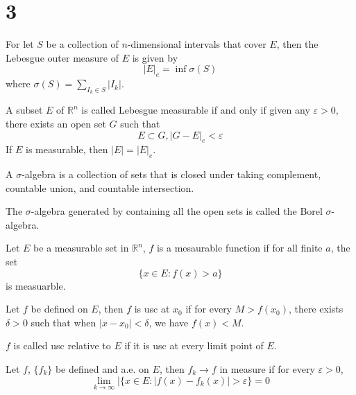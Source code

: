 \documentclass[openany]{book}
\newcommand{\R}{\mathbb{R}}
\begin{document}
\chapter{3}
\begin{defn}
    For let $S$ be a collection of $n$-dimensional intervals that cover $E$, then the Lebesgue outer measure of $E$ is given by
    \begin{equation*}
        |E|_e=\inf\sigma(S)
    \end{equation*}
    where $\sigma(S)=\sum_{I_k\in S}|I_k|$.
\end{defn}
\begin{defn}
    A subset $E$ of $\R^n$ is called Lebesgue measurable if and only if given any $\varepsilon>0$, there exists an open set $G$ such that 
    \begin{equation*}
        E\subset G, |G-E|_e<\varepsilon
    \end{equation*}
    If $E$ is measurable, then $|E|=|E|_e$.
\end{defn}
\begin{defn}
    A $\sigma$-algebra is a collection of sets that is closed under taking complement, countable union, and countable intersection.

    The $\sigma$-algebra generated by containing all the open sets is called the Borel $\sigma$-algebra.
\end{defn}
\begin{defn}
    Let $E$ be a measurable set in $\R^n$, $f$ is a mesaurable function if for all finite $a$, the set 
    \begin{equation*}
        \{x\in E: f(x)>a\}
    \end{equation*}
    is measuarble. 
\end{defn}
\begin{defn}
    Let $f$ be defined on $E$, then $f$ is usc at $x_0$ if for every $M>f(x_0)$, there exists $\delta>0$ such that when $|x-x_0|<\delta$, we have $f(x)<M$.

    $f$ is called usc relative to $E$ if it is usc at every limit point of $E$.
\end{defn}
\begin{defn}
    Let $f$, $\{f_k\}$ be defined and a.e. on $E$, then $f_k\to f$ in measure if for every $\varepsilon>0$, 
    \begin{equation*}
        \lim_{k\to\infty}|\{x\in E: |f(x)-f_k(x)|>\varepsilon\}=0
    \end{equation*}
\end{defn}
\end{document}
